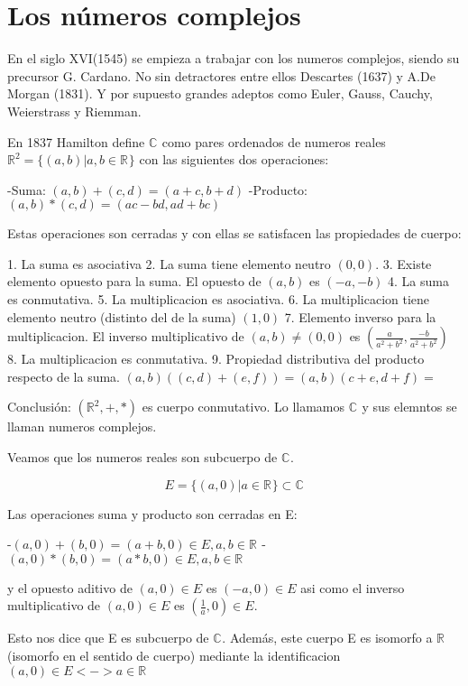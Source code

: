 \section{Los números complejos}
En el siglo XVI(1545) se empieza a trabajar con los numeros complejos, siendo su precursor G. Cardano.
No sin detractores entre ellos Descartes (1637) y A.De Morgan (1831).
Y por supuesto grandes adeptos como Euler, Gauss, Cauchy, Weierstrass y Riemman.

En 1837 Hamilton define \(\mathbb{C}^{}\) como pares ordenados de numeros reales \(\mathbb{R}^{2}=\{(a,b) | a,b \in \mathbb{R}^{}\}\) con las siguientes dos operaciones:

-Suma: \((a,b)+(c,d) = (a+c, b+d)\)
-Producto: \((a,b)*(c,d) = (ac-bd, ad+bc)\)

Estas operaciones son cerradas y con ellas se satisfacen las propiedades de cuerpo:

1. La suma es asociativa
2. La suma tiene elemento neutro \((0,0)\).
3. Existe elemento opuesto para la suma. El opuesto de \((a,b)\) es \((-a,-b)\)
4. La suma es conmutativa.
5. La multiplicacion es asociativa.
6. La multiplicacion tiene elemento neutro (distinto del de la suma) \((1,0)\)
7. Elemento inverso para la multiplicacion. El inverso multiplicativo de \((a,b) \neq (0,0)\) es \((\frac{a}{a^2+b^2},\frac{-b}{a^2+b^2})\)
8. La multiplicacion es conmutativa.
9. Propiedad distributiva del producto respecto de la suma. \((a,b)((c,d)+(e,f))=(a,b)(c+e,d+f) = \)

Conclusión: \((\mathbb{R}^{2},+,*)\) es cuerpo conmutativo. Lo llamamos \(\mathbb{C}^{}\) y sus elemntos se llaman numeros complejos.

Veamos que los numeros reales son subcuerpo de \(\mathbb{C}^{}\).

\[ E= \{(a,0) | a \in \mathbb{R}^{}\} \subset \mathbb{C}^{}\]

Las operaciones suma y producto son cerradas en E:

-\((a,0) + (b,0) = (a+b, 0) \in E, a,b \in \mathbb{R}^{}\) 
-\((a,0)*(b,0) = (a*b, 0) \in E, a,b \in \mathbb{R}^{}\)

y el opuesto aditivo de \( (a,0) \in E\) es \( (-a,0) \in E\) asi como el inverso multiplicativo de  \( (a,0) \in E\) es \( (\frac{1}{a},0) \in E\).

Esto nos dice que E es subcuerpo de \(\mathbb{C}^{}\). Además, este cuerpo E es isomorfo a \(\mathbb{R}^{}\) (isomorfo en el sentido de cuerpo) mediante la identificacion \((a,0) \in E <-> a \in \mathbb{R}^{}\) %

